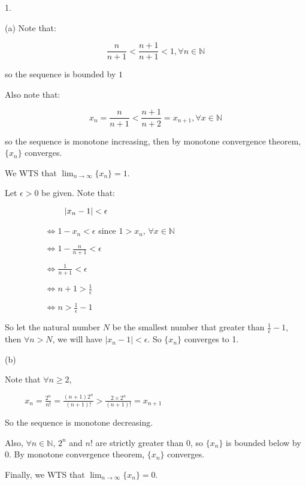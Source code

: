 \documentclass{article}
\begin{document}
1.

(a) Note that: 

$$ \frac{n}{n+1} < \frac{n+1}{n+1} < 1 , \forall n \in \mathbb{N}$$ 

so the sequence is bounded by $1$

Also note that: 

$$x_{n} = \frac{n}{n+1} < \frac{n+1}{n+2} = x_{n+1}, \forall x \in \mathbb{N}$$

so the sequence is monotone increasing, then by monotone convergence theorem,  $\{ x_{n} \}$ converges. 

We WTS that $\lim_{n\rightarrow \infty}\{x_{n} \}= 1$. 

Let $\epsilon > 0$ be given. Note that: 

$\hspace{2.5cm} |x_{n} - 1| < \epsilon$

$\hspace{2cm} \Leftrightarrow 1-x_{n} < \epsilon $  since $ 1>x_{n} \text{, } \forall x \in \mathbb{N}$

$\hspace{2cm} \Leftrightarrow 1-\frac{n}{n+1} < \epsilon$

$\hspace{2cm} \Leftrightarrow \frac{1}{n+1} < \epsilon$

$\hspace{2cm} \Leftrightarrow n+1 > \frac{1}{\epsilon}$

$\hspace{2cm} \Leftrightarrow n > \frac{1}{\epsilon} -1$

So let the natural number $N$ be the smallest number that greater than $\frac{1}{\epsilon} -1$, then $\forall n > N$, we will have $|x_{n} - 1| < \epsilon$.
So $\{ x_{n} \} $ converges to 1.

(b)

Note that $\forall n \geq 2$, 

$\hspace{1cm} x_{n} = \frac{2^n}{n!} = \frac{(n+1)2^n}{(n+1)!} > \frac{2\times2^n}{(n+1)!} = x_{n+1}$

So the sequence is monotone decreasing. 

Also, $\forall n \in \mathbb{N}$, $2^n$ and $n!$ are strictly greater than 0, so $\{ x_{n} \}$ is bounded below by $0$. By monotone convergence theorem, $\{ x_{n} \}$ converges. 

Finally, we WTS that  $\lim_{n \rightarrow \infty} \{x_{n} \}= 0$.
\end{document}
